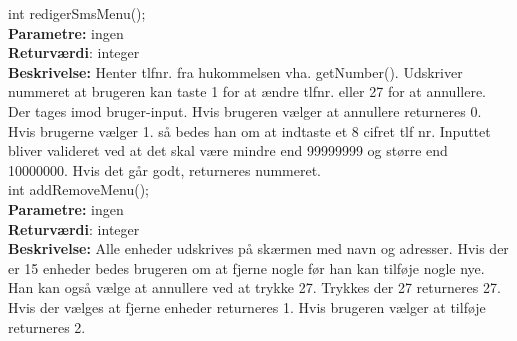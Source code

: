 \newpage
int redigerSmsMenu(); \\
\textbf{Parametre:} ingen \\
\textbf{Returværdi}: integer \\
\textbf{Beskrivelse:} Henter tlfnr. fra hukommelsen vha. getNumber(). Udskriver nummeret at brugeren kan taste 1 for at ændre tlfnr. eller 27 for at annullere. Der tages imod bruger-input. Hvis brugeren vælger at annullere returneres 0. Hvis brugerne vælger 1. så bedes han om at indtaste et 8 cifret tlf nr. Inputtet bliver valideret ved at det skal være mindre end 99999999 og større end 10000000. Hvis det går godt, returneres nummeret. \\

int addRemoveMenu(); \\
\textbf{Parametre:} ingen \\
\textbf{Returværdi}: integer \\
\textbf{Beskrivelse:} Alle enheder udskrives på skærmen med navn og adresser. Hvis der er 15 enheder bedes brugeren om at fjerne nogle før han kan tilføje nogle nye. Han kan også vælge at annullere ved at trykke 27. Trykkes der 27 returneres 27. Hvis der vælges at fjerne enheder returneres 1. Hvis brugeren vælger at tilføje returneres 2. \\




